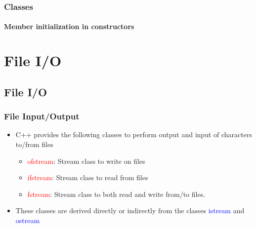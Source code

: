 \documentclass[hyperref={pdfpagelabels=true}]{beamer}
\begin{document}
\begin{frame}[shrink]
\frametitle{Classes}
\framesubtitle{Member initialization in constructors}
\begin{tcolorbox}[title= ,width=14.85 cm]
\scriptsize

\end{tcolorbox}
\end{frame}


\section{File I/O}

\subsection{File I/O}

\begin{frame}[fragile]
\frametitle{File Input/Output}
\begin{itemize}[<+->]
\item C++ provides the following classes to perform output and input of characters to/from files
\begin{itemize}[<+->]
\item \alert{\textcolor{red}{ofstream}}: Stream class to write on files
\item  \alert{\textcolor{red}{ifstream}}: Stream class to read from files
\item  \alert{\textcolor{red}{fstream}}: Stream class to both read and write from/to files.
\end{itemize}
\item These classes are derived directly or indirectly from the classes \textcolor{blue}{istream} and \textcolor{blue}{ostream}
\end{itemize}

\end{frame}
\end{document}
